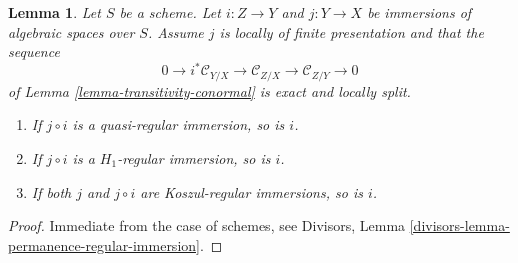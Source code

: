 \documentclass[10pt,a4paper]{amsart}
\theoremstyle{plain}
\newtheorem{lemma}[subsection]{Lemma}
\theoremstyle{definition}
\theoremstyle{remark}
\numberwithin{equation}{subsection}
\begin{document}
\begin{lemma}
\label{lemma-permanence-regular-immersion}
Let $S$ be a scheme. Let $i : Z \to Y$ and $j : Y \to X$ be immersions of
algebraic spaces over $S$. Assume $j$ is locally of finite presentation
and that the sequence
$$
0 \to i^*\mathcal{C}_{Y/X} \to
\mathcal{C}_{Z/X} \to
\mathcal{C}_{Z/Y} \to 0
$$
of Lemma \ref{lemma-transitivity-conormal} is exact and locally split.
\begin{enumerate}
\item If $j \circ i$ is a quasi-regular immersion, so is $i$.
\item If $j \circ i$ is a $H_1$-regular immersion, so is $i$.
\item If both $j$ and $j \circ i$ are Koszul-regular immersions, so is $i$.
\end{enumerate}
\end{lemma}

\begin{proof}
Immediate from the case of schemes, see
Divisors, Lemma \ref{divisors-lemma-permanence-regular-immersion}.
\end{proof}
\end{document}
